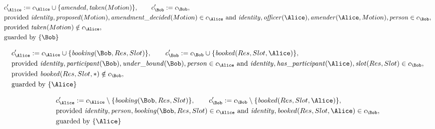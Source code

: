 \begin{align*}
&
c'_
{
\Alice
}
 := 
c_
{
\Alice
}
 \cup 
\{
\mathit{\detokenize{
amended
}}
,
\mathit{\detokenize{
taken
}}
(
Motion
)
\}
, \qquad 
c'_
{
\Bob
}
 := 
c_
{
\Bob
}
,\\
&
\text{provided } 
\mathit{\detokenize{
identity
}}
,
\mathit{\detokenize{
proposed
}}
(
Motion
)
,
\mathit{\detokenize{
amendment_decided
}}
(
Motion
)
 \in c_
{
\Alice
}
 \text{ and } 
\mathit{\detokenize{
identity
}}
,
\mathit{\detokenize{
officer
}}
(
\Alice
)
,
\mathit{\detokenize{
amender
}}
(
\Alice
,
Motion
)
,
\mathit{\detokenize{
person
}}
 \in c_
{
\Bob
}
,\\
&
\text{provided } 
\mathit{\detokenize{
taken
}}
(
Motion
)
 \notin c_
{
\Alice
}
,\\
&
\text{guarded by } \{
\Bob
\}
\end{align*}

\begin{align*}
&
c'_
{
\Alice
}
 := 
c_
{
\Alice
}
 \cup 
\{
\mathit{\detokenize{
booking
}}
(
\Bob
,
Res
,
Slot
)
\}
, \qquad 
c'_
{
\Bob
}
 := 
c_
{
\Bob
}
 \cup 
\{
\mathit{\detokenize{
booked
}}
(
Res
,
Slot
,
\Alice
)
\}
,\\
&
\text{provided } 
\mathit{\detokenize{
identity
}}
,
\mathit{\detokenize{
participant
}}
(
\Bob
)
,
\mathit{\detokenize{
under_bound
}}
(
\Bob
)
,
\mathit{\detokenize{
person
}}
 \in c_
{
\Alice
}
 \text{ and } 
\mathit{\detokenize{
identity
}}
,
\mathit{\detokenize{
has_participant
}}
(
\Alice
)
,
\mathit{\detokenize{
slot
}}
(
Res
,
Slot
)
 \in c_
{
\Bob
}
,\\
&
\text{provided } 
\mathit{\detokenize{
booked
}}
(
Res
,
Slot
,
\ast
)
 \notin c_
{
\Bob
}
,\\
&
\text{guarded by } \{
\Alice
\}
\end{align*}

\begin{align*}
&
c'_
{
\Alice
}
 := 
c_
{
\Alice
}
 \setminus 
\{
\mathit{\detokenize{
booking
}}
(
\Bob
,
Res
,
Slot
)
\}
, \qquad 
c'_
{
\Bob
}
 := 
c_
{
\Bob
}
 \setminus 
\{
\mathit{\detokenize{
booked
}}
(
Res
,
Slot
,
\Alice
)
\}
,\\
&
\text{provided } 
\mathit{\detokenize{
identity
}}
,
\mathit{\detokenize{
person
}}
,
\mathit{\detokenize{
booking
}}
(
\Bob
,
Res
,
Slot
)
 \in c_
{
\Alice
}
 \text{ and } 
\mathit{\detokenize{
identity
}}
,
\mathit{\detokenize{
booked
}}
(
Res
,
Slot
,
\Alice
)
 \in c_
{
\Bob
}
,\\
&
\text{guarded by } \{
\Alice
\}
\end{align*}
